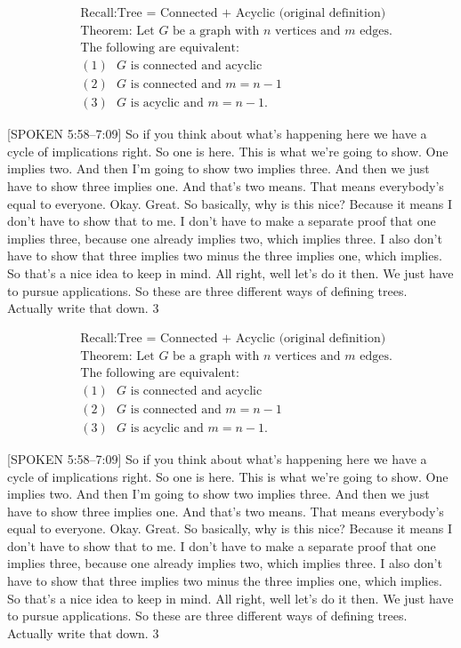 \documentclass[11pt]{article}
\theoremstyle{definition}
\begin{document}
\begin{align*}
& \text{Recall:} \text{Tree = Connected + Acyclic (original definition)} \\
& \text{Theorem: Let } G \text{ be a graph with } n \text{ vertices and } m \text{ edges.} \\
& \text{The following are equivalent:} \\
& (1) \text{ } G \text{ is connected and acyclic} \\
& (2) \text{ } G \text{ is connected and } m=n-1 \\
& (3) \text{ } G \text{ is acyclic and } m=n-1.
\end{align*}

[SPOKEN 5:58–7:09]
So if you think about what's happening here we have a cycle of implications right. So one is here. This is what we're going to show. One implies two. And then I'm going to show two implies three. And then we just have to show three implies one. And that’s two means. That means everybody’s equal to everyone. Okay. Great. So basically, why is this nice? Because it means I don't have to show that to me. I don't have to make a separate proof that one implies three, because one already implies two, which implies three. I also don't have to show that three implies two minus the three implies one, which implies. So that’s a nice idea to keep in mind. All right, well let’s do it then. We just have to pursue applications. So these are three different ways of defining trees. Actually write that down. 3%

\begin{align*}
& \text{Recall:} \text{Tree = Connected + Acyclic (original definition)} \\
& \text{Theorem: Let } G \text{ be a graph with } n \text{ vertices and } m \text{ edges.} \\
& \text{The following are equivalent:} \\
& (1) \text{ } G \text{ is connected and acyclic} \\
& (2) \text{ } G \text{ is connected and } m=n-1 \\
& (3) \text{ } G \text{ is acyclic and } m=n-1.
\end{align*}

[SPOKEN 5:58–7:09]
So if you think about what's happening here we have a cycle of implications right. So one is here. This is what we're going to show. One implies two. And then I'm going to show two implies three. And then we just have to show three implies one. And that’s two means. That means everybody’s equal to everyone. Okay. Great. So basically, why is this nice? Because it means I don't have to show that to me. I don't have to make a separate proof that one implies three, because one already implies two, which implies three. I also don't have to show that three implies two minus the three implies one, which implies. So that’s a nice idea to keep in mind. All right, well let’s do it then. We just have to pursue applications. So these are three different ways of defining trees. Actually write that down. 3%
\end{document}
